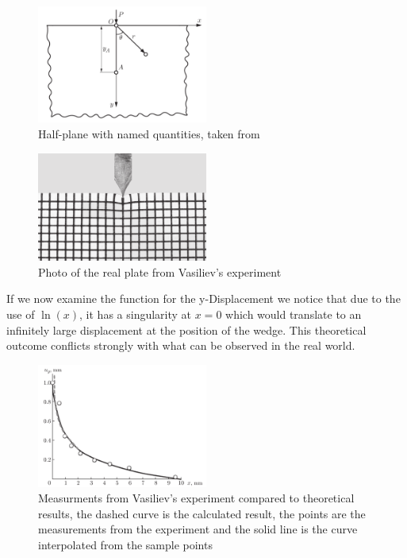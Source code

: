 \documentclass[journal]{IEEEtran}
\begin{document}
\begin{figure}
    \centering
    \includegraphics[width=0.5\textwidth]{images/halfplane_scheme.png}
    \caption{Half-plane with named quantities, taken from \cite{Vasiliev}}
\end{figure}

\begin{figure}
    \centering
    \includegraphics[width=0.5\textwidth]{images/halfplane_photo.png}
    \caption{Photo of the real plate from Vasiliev's\cite{Vasiliev} experiment}
\end{figure}

If we now examine the function for the y-Displacement we notice that due to the use of $\ln(x)$, it has a singularity at $x = 0$ which would translate to an infinitely large displacement at the position of the wedge.
This theoretical outcome conflicts strongly with what can be observed in the real world.

\begin{figure}[H]
    \centering
    \includegraphics[width=0.5\textwidth]{images/displacement_graph.png}
    \caption{Measurments from Vasiliev's experiment compared to theoretical results, the dashed curve is the calculated result, the points are the measurements from the experiment and the solid line is the curve interpolated from the sample points}
\end{figure}
\end{document}
